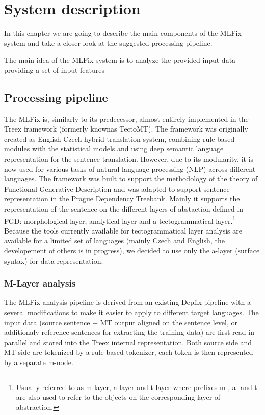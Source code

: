 \chapter{System description}
\label{chap:system_descr}

In this chapter we are going to describe the main components
of the MLFix system and take a closer look at the suggested processing pipeline.

The main idea of the MLFix system is to analyze the provided input data providing
a set of input features 

\section{Processing pipeline}

The MLFix is, similarly to its predecessor, almost entirely implemented in the
Treex\cite{Popel:2010:TMN:1884371.1884406}
framework (formerly knownas TectoMT).
The framework was originally created as English-Czech hybrid translation system, combining
rule-based modules with the statistical models and using deep semantic language representation
for the sentence translation. However, due to its modularity, it is
now used for various tasks of natural language processing (NLP) across different
languages. The framework was built to support the methodology of the theory of Functional Generative Description\cite{Sgall1967}
and was adapted to support sentence representation in the Prague Dependency Treebank\cite{pdt20:2006}.
Mainly it supports the representation of the sentence on the different layers of abstaction defined in FGD: morphological layer,
analytical layer and a tectogrammatical layer.\footnote{Usually referred to as m-layer, a-layer and t-layer where prefixes m-, a- and t- are also used to refer to the objects on the corresponding layer of abstraction.}
Because the tools currently available for tectogrammatical layer analysis are available for
a limited set of languages (mainly Czech and English, the developement of others is in progress),
we decided to use only the a-layer (surface syntax) for data representation.

\subsection{M-Layer analysis}

The MLFix analysis pipeline is derived from an existing Depfix pipeline
with a several modifications to make it easier to apply to different
target languages. The input data (source sentence + MT output aligned on the sentence level,
or additionaly reference sentences for extracting the training data)
are first read in parallel and stored into the Treex internal representation.
Both source side and MT side are tokenized by a rule-based tokenizer, each token is then
represented by a separate m-node.

